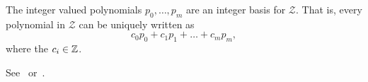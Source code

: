 \documentclass[journal]{IEEEtran}
\begin{document}
\begin{lemma}\label{lem:intvalpol}
  The integer valued polynomials $p_0,\dots,p_m$ are an integer basis for $\mathcal{Z}$.  That is, every polynomial in $\mathcal{Z}$ can be uniquely written as
\begin{equation} \label{eq:lem_polynomial}
c_0 p_0 + c_1 p_1 + \dots + c_m p_m,
\end{equation}
where the $c_i \in {\mathbb Z}$.
\end{lemma}
\begin{IEEEproof}
See~\citep[p. 2]{cahen_integer-valued_1997} or~\cite{McKilliam2009IndentifiabliltyAliasingPolyphase}. 
\end{IEEEproof}
\end{document}
